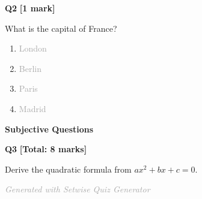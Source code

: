 \documentclass[11pt]{article}
\begin{document}
\begin{mcqbox}
\textcolor{primaryblue}{\textbf{\large Q2}} \hfill \textcolor{accentorange}{\textbf{[1 mark]}}
\vspace{8pt}

What is the capital of France?

\vspace{8pt}
\begin{enumerate}[label=\textbf{(\Alph*)}, leftmargin=25pt, itemsep=4pt]

  \item \textcolor{darkgray}{London}

  \item \textcolor{darkgray}{Berlin}

  \item \textcolor{darkgray}{Paris}

  \item \textcolor{darkgray}{Madrid}

\end{enumerate}
\end{mcqbox}
\vspace{8pt}




\vspace{15pt}
\begin{center}
  \textcolor{accentorange}{\Large\textbf{Subjective Questions}}
\end{center}
\vspace{10pt}


\begin{subjectivebox}
\textcolor{primaryblue}{\textbf{\large Q3}} \hfill \textcolor{accentorange}{\textbf{[Total: 8 marks]}}
\vspace{8pt}

Derive the quadratic formula from $ax^2 + bx + c = 0$.
\end{subjectivebox}
\vspace{12pt}

\vspace{12pt}



\vfill
\begin{center}
  \textcolor{darkgray}{\small\textit{Generated with Setwise Quiz Generator}}
\end{center}
\end{document}
